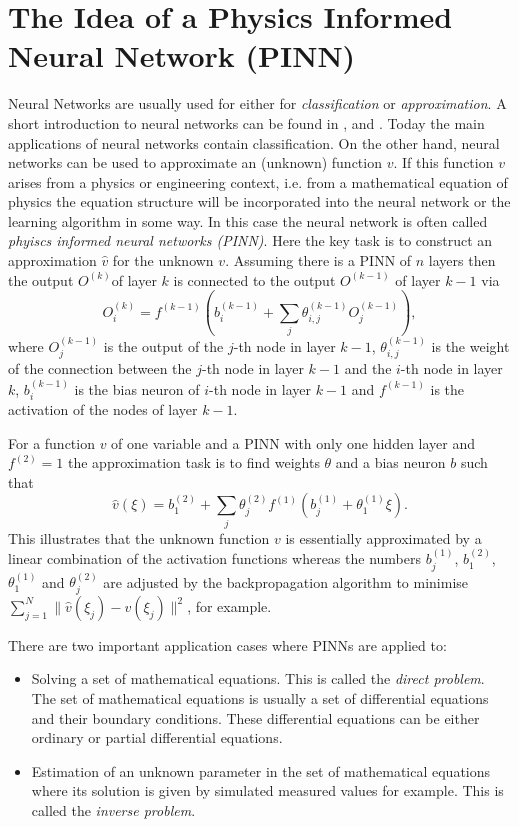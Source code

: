 \documentclass[a4paper,11pt]{article}
\begin{document}
\section{The Idea of a Physics Informed Neural Network (PINN)}

Neural Networks are usually used for either for \emph{classification} or \emph{approximation}. A short introduction to neural networks can be found in \cite[pp. 809]{stoecker1995formeln}, \cite{rey2011neuralnetworks} and \cite{rojas1993neuronale}. Today the main applications of neural networks contain classification. On the other hand, neural networks can be used to approximate an (unknown) function $v$. If this function $v$ arises from a physics or engineering context, i.e. from a mathematical equation of  physics the equation structure will be incorporated into the neural network or the learning algorithm in some way. In this case the neural network is often called \emph{phyiscs informed neural networks (PINN)}. Here the key task is to construct an approximation $ \hat{v} $ for the unknown $v$. Assuming there is a PINN of $n$ layers then the output $O^{(k)} $of layer $k$ is connected to the output $O^{(k-1)} $ of layer $k-1$ via
\begin{equation*}
O^{(k)}_i = f^{(k-1)}\left( b^{(k-1)}_i + \sum_j \theta^{(k-1)}_{i,j} O^{(k-1)}_j \right),
\end{equation*}
where $ O^{(k-1)}_j $ is  the output of the $j$-th node in layer $k-1$, $ \theta^{(k-1)}_{i,j} $ is the weight of the connection between  the $j$-th node in layer $k-1$ and the $i$-th node in layer $k$, $ b^{(k-1)}_i $ is the bias neuron of $i$-th node in layer $k-1$ and $f^{(k-1)}$ is the activation of the nodes of layer $k-1$.

For a function $v$ of one variable and a PINN with only one hidden layer and $f^{(2)} = 1 $ the approximation task is to find weights $\theta $ and a bias neuron $b$ such that
\begin{equation*}
\hat{v} (\xi) =   b_1^{(2)} + \sum_j \theta^{(2)}_j f^{(1)}\left( b_j^{(1)} + \theta_1^{(1)} \xi \right).
\end{equation*}
This illustrates that the unknown function $v$ is essentially approximated by a linear combination of the activation functions whereas the numbers $b_j^{(1)}$, $ b_1^{(2)} $, $ \theta_1^{(1)} $ and $ \theta^{(2)}_j $ are adjusted by the backpropagation algorithm to minimise $ \sum_{j=1}^N\| \hat{v} (\xi_j) - v(\xi_j) \|^2 $, for example.

There are two important application cases where PINNs are applied to:
\begin{itemize}
\item Solving a set of mathematical equations. This is called the \emph{direct problem}. The set of mathematical equations is usually a set of differential equations and their boundary conditions. These differential equations can be either ordinary or partial differential equations.
\item Estimation of an unknown parameter in the set of mathematical equations where its solution is given by simulated measured values for example. This is called the \emph{inverse problem}.
\end{itemize}
\end{document}
